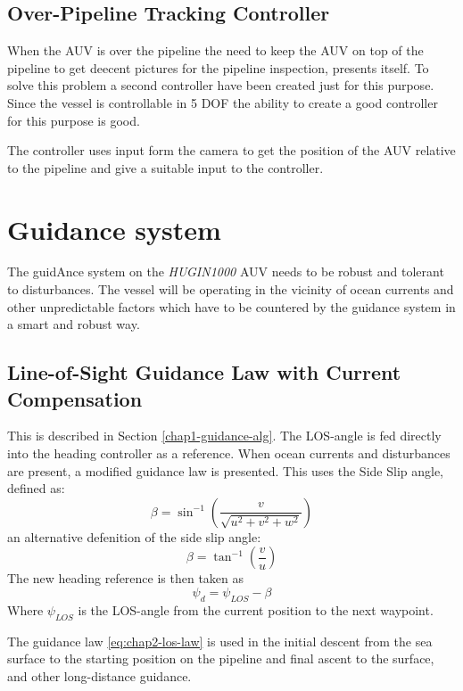 	
	\subsection{Over-Pipeline Tracking Controller}
		When the AUV is over the pipeline the need to keep the AUV on top of the pipeline to get deecent 
		pictures for the pipeline inspection, presents itself. To solve this problem a second controller 
		have been created just for this purpose. Since the vessel is controllable in 5 DOF the ability to 
		create a good controller for this purpose is good. 
		
		The controller uses input form the camera to get the position of the AUV relative to the pipeline 
		and give a suitable input to the controller.
		
\section{Guidance system}
	The guidAnce system on the \textit{HUGIN1000} AUV needs to be robust and tolerant to disturbances. The 
	vessel will be operating in the vicinity of ocean currents and other unpredictable factors which have to 
	be countered by the guidance system in a smart and robust way.
	
	
	
	\subsection{Line-of-Sight Guidance Law with Current Compensation}
		This is described in Section \ref{chap1-guidance-alg}. The LOS-angle is fed directly into the 
		heading controller as a reference. When ocean currents and disturbances are present, a modified 
		guidance law is presented. This uses the Side Slip angle, defined as:
		\begin{equation}
			\label{eq:chap2-sideslip}
			\beta = \sin^{-1} ( \frac{v}{\sqrt{u^2 + v^2 + w^2}})
		\end{equation}
		an alternative defenition of the side slip angle:
		\begin{equation*}
			\beta = \tan^{-1} (\frac{v}{u})
		\end{equation*}
		The new heading reference is then taken as
		\begin{equation}
			\label{eq:chap2-los-law}
			\psi_d = \psi_{LOS} - \beta
		\end{equation}
		Where $\psi_{LOS}$ is the LOS-angle from the current position to the next waypoint.
		
		The guidance law \eqref{eq:chap2-los-law} is used in the initial descent from the sea surface to the 
		starting position on the pipeline and final ascent to the surface, and other long-distance guidance.
		

